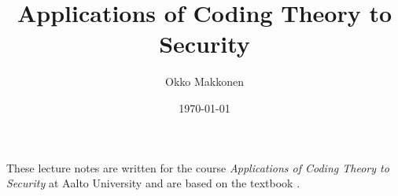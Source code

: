 \documentclass[english, parskip, longtitle]{myarticle}
\title{Applications of Coding Theory to Security}
\author{Okko Makkonen}
\date{\today}
\begin{document}
\maketitle

These lecture notes are written for the course \emph{Applications of Coding Theory to Security} at Aalto University and are based on the textbook \cite{ling2004coding}.



\newpage


\newpage


\newpage


\newpage


\newpage


\newpage


\newpage


\newpage
\printbibliography
\end{document}
